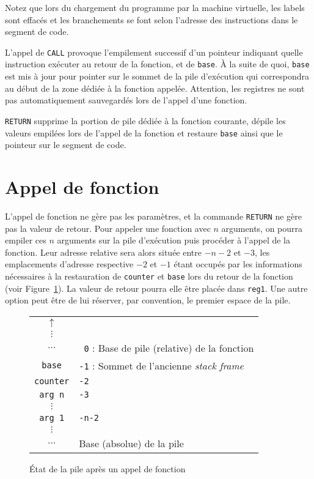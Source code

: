 \documentclass[12pt,a4]{article}
\begin{document}
Notez que lors du chargement du programme par la machine virtuelle,
les labels sont effacés et les branchements se font selon l'adresse
des instructions dans le segment de code.

L'appel de {\tt CALL} provoque l'empilement successif d'un pointeur
indiquant quelle instruction exécuter au retour de la fonction, et de
{\tt base}. À la suite de quoi, {\tt base} est mis à jour pour
pointer sur le sommet de la pile d'exécution qui correspondra au
début de la zone dédiée à la fonction appelée. Attention, les
registres ne sont pas automatiquement sauvegardés lors de l'appel
d'une fonction.

{\tt RETURN} supprime la portion de pile dédiée à la fonction
courante, dépile les valeurs empilées lors de l'appel de la fonction
et restaure {\tt base} ainsi que le pointeur sur le segment de code.

\section{Appel de fonction}
L'appel de fonction ne gère pas les paramètres, et la commande
{\tt RETURN} ne gère pas la valeur de retour.  Pour appeler une
fonction avec $n$ arguments, on pourra empiler ces $n$ arguments sur
la pile d'exécution puis procéder à l'appel de la fonction. Leur
adresse relative sera alors située entre $-n-2$ et $-3$, les
emplacements d'adresse respective $-2$ et $-1$ étant occupés par les
informations nécessaires à la restauration de {\tt counter} et
{\tt base} lors du retour de la fonction (voir Figure~\ref{fig:stack}).
La valeur de retour pourra elle être placée dans {\tt reg1}. Une
autre option peut être de lui réserver, par convention, le premier
espace de la pile.

\begin{figure}
\centering
\begin{tabular}{|c|l}
$\uparrow$    &\\
\cline{1-1}
$\vdots$      &\\
\cline{1-1}
$\ldots$      & {\tt ~0} : Base de pile (relative) de la fonction\\
\cline{1-1}
{\tt base}    & {\tt -1} : Sommet de l'ancienne \emph{stack frame}\\
\cline{1-1}
{\tt counter} & {\tt -2}\\
\cline{1-1}
{\tt arg n}   & {\tt -3} \\
\cline{1-1}
$\vdots$      & \\
\cline{1-1}
{\tt arg 1}   & {\tt -n-2}\\
\cline{1-1}
$\vdots$      &\\
\cline{1-1}
$\ldots$      & Base (absolue) de la pile\\
\cline{1-1}
\end{tabular}
\caption{État de la pile après un appel de fonction}
\label{fig:stack}
\end{figure}
\end{document}
